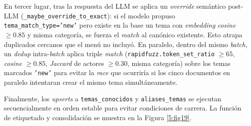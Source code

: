 \documentclass[listof=nochaptergap,12pt,times,authoryear]{report}
\begin{document}
En tercer lugar, tras la respuesta del LLM se aplica un \textit{override}
semántico post-LLM (\texttt{\_maybe\_override\_to\_exact}): si el modelo propuso
\texttt{tema\_match\_type='new'} pero existe en la base un tema con
\textit{embedding} \textit{cosine} $\geq 0.85$ y misma categoría, se fuerza el
\textit{match} al canónico existente. Esto atrapa duplicados cercanos que el menú
no incluyó. En paralelo, dentro del mismo \textit{batch}, un \textit{dedup}
intra-\textit{batch} aplica triple \textit{match}
(\texttt{rapidfuzz.token\_set\_ratio} $\geq 65$, \textit{cosine} $\geq 0.85$,
\textit{Jaccard} de actores $\geq 0.30$, misma categoría) sobre los temas marcados
\texttt{'new'} para evitar la \textit{race} que ocurriría si los cinco documentos
en paralelo intentaran crear el mismo tema simultáneamente.

Finalmente, los \textit{upserts} a \texttt{temas\_conocidos} y
\texttt{aliases\_temas} se ejecutan secuencialmente en orden estable para evitar
condiciones de carrera. La función de etiquetado y consolidación se muestra en la
Figura \ref{5:fig19}.
\end{document}
